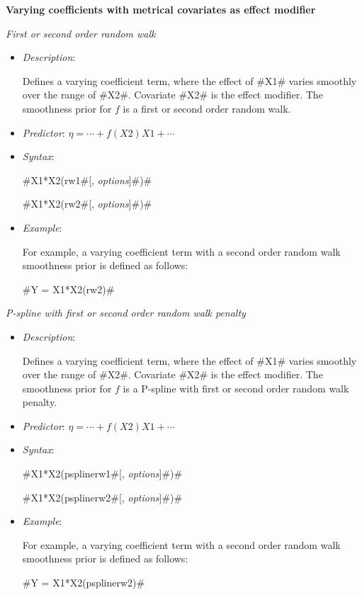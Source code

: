 {\bf Varying coefficients with metrical covariates as effect
modifier} \medskip

{\em First or second order random walk}

\begin{itemize}
\item[] {\em Description}:

Defines a varying coefficient term, where the effect of #X1# varies
smoothly over the range of #X2#. Covariate #X2# is the effect
modifier. The smoothness prior for $f$ is a first or second order
random walk.
\item[] {\em Predictor}: $\eta= \cdots + f(X2)X1 + \cdots$
\item[] {\em Syntax}:

#X1*X2(rw1#[, {\em options}]#)#

#X1*X2(rw2#[, {\em options}]#)#
\item[] {\em Example}:

For example, a varying coefficient term with a second order random
walk smoothness prior is defined as follows:

#Y = X1*X2(rw2)#
\end{itemize}


{\em P-spline with first or second order random walk penalty}
\begin{itemize}
\item[] {\em Description}:

Defines a varying coefficient term, where the effect of #X1# varies
smoothly over the range of #X2#. Covariate #X2# is the effect
modifier. The smoothness prior for $f$ is a P-spline with first or
second order random walk penalty.
\item[] {\em Predictor}: $\eta= \cdots + f(X2)X1 + \cdots$
\item[] {\em Syntax}:

#X1*X2(psplinerw1#[, {\em options}]#)#

#X1*X2(psplinerw2#[, {\em options}]#)#
\item[] {\em Example}:

For example, a varying coefficient term with a second order random
walk smoothness prior is defined as follows:

#Y = X1*X2(psplinerw2)#

\end{itemize}

